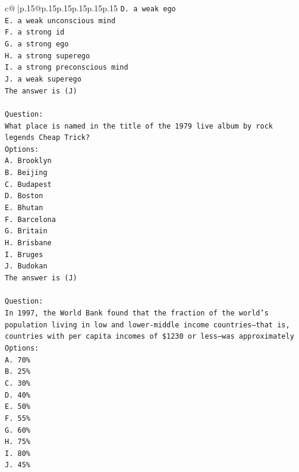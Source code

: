 \documentclass{article}
\begin{document}
{\begin{supertabular}{c@{$\;$}|p{.15\linewidth}@{}p{.15\linewidth}p{.15\linewidth}p{.15\linewidth}p{.15\linewidth}p{.15\linewidth}}
{{{\texttt{D. a weak ego} \\
\texttt{E. a weak unconscious mind} \\
\texttt{F. a strong id} \\
\texttt{G. a strong ego} \\
\texttt{H. a strong superego} \\
\texttt{I. a strong preconscious mind} \\
\texttt{J. a weak superego} \\
\texttt{The answer is (J)} \\
\\ 
\texttt{Question:} \\
\texttt{What place is named in the title of the 1979 live album by rock legends Cheap Trick?} \\
\texttt{Options:} \\
\texttt{A. Brooklyn} \\
\texttt{B. Beijing} \\
\texttt{C. Budapest} \\
\texttt{D. Boston} \\
\texttt{E. Bhutan} \\
\texttt{F. Barcelona} \\
\texttt{G. Britain} \\
\texttt{H. Brisbane} \\
\texttt{I. Bruges} \\
\texttt{J. Budokan} \\
\texttt{The answer is (J)} \\
\\ 
\texttt{Question:} \\
\texttt{In 1997, the World Bank found that the fraction of the world’s population living in low and lower{-}middle income countries—that is, countries with per capita incomes of \$1230 or less—was approximately} \\
\texttt{Options:} \\
\texttt{A. 70\%} \\
\texttt{B. 25\%} \\
\texttt{C. 30\%} \\
\texttt{D. 40\%} \\
\texttt{E. 50\%} \\
\texttt{F. 55\%} \\
\texttt{G. 60\%} \\
\texttt{H. 75\%} \\
\texttt{I. 80\%} \\
\texttt{J. 45\%} \\
            }
        }
    }
     \\ \\


\end{supertabular}}
\end{document}
